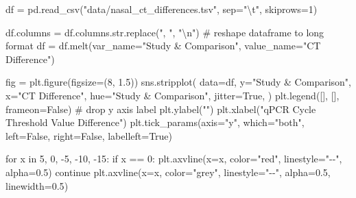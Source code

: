\documentclass[
  letterpaper,
  DIV=11,
  numbers=noendperiod]{scrartcl}
\newenvironment{Shaded}{\begin{snugshade}}{\end{snugshade}}
\newcommand{\BuiltInTok}[1]{\textcolor[rgb]{0.00,0.23,0.31}{#1}}
\newcommand{\CharTok}[1]{\textcolor[rgb]{0.13,0.47,0.30}{#1}}
\newcommand{\CommentTok}[1]{\textcolor[rgb]{0.37,0.37,0.37}{#1}}
\newcommand{\ControlFlowTok}[1]{\textcolor[rgb]{0.00,0.23,0.31}{#1}}
\newcommand{\DecValTok}[1]{\textcolor[rgb]{0.68,0.00,0.00}{#1}}
\newcommand{\FloatTok}[1]{\textcolor[rgb]{0.68,0.00,0.00}{#1}}
\newcommand{\KeywordTok}[1]{\textcolor[rgb]{0.00,0.23,0.31}{#1}}
\newcommand{\NormalTok}[1]{\textcolor[rgb]{0.00,0.23,0.31}{#1}}
\newcommand{\OperatorTok}[1]{\textcolor[rgb]{0.37,0.37,0.37}{#1}}
\newcommand{\StringTok}[1]{\textcolor[rgb]{0.13,0.47,0.30}{#1}}
\newcommand{\VariableTok}[1]{\textcolor[rgb]{0.07,0.07,0.07}{#1}}
\begin{document}
\begin{Shaded}
\begin{Highlighting}[]
\NormalTok{df }\OperatorTok{=}\NormalTok{ pd.read\_csv(}\StringTok{"data/nasal\_ct\_differences.tsv"}\NormalTok{, sep}\OperatorTok{=}\StringTok{"}\CharTok{\textbackslash{}t}\StringTok{"}\NormalTok{, skiprows}\OperatorTok{=}\DecValTok{1}\NormalTok{)}

\NormalTok{df.columns }\OperatorTok{=}\NormalTok{ df.columns.}\BuiltInTok{str}\NormalTok{.replace(}\StringTok{", "}\NormalTok{, }\StringTok{"}\CharTok{\textbackslash{}n}\StringTok{"}\NormalTok{)}
\CommentTok{\# reshape dataframe to long format}
\NormalTok{df }\OperatorTok{=}\NormalTok{ df.melt(var\_name}\OperatorTok{=}\StringTok{"Study \& Comparison"}\NormalTok{, value\_name}\OperatorTok{=}\StringTok{"CT Difference"}\NormalTok{)}


\NormalTok{fig }\OperatorTok{=}\NormalTok{ plt.figure(figsize}\OperatorTok{=}\NormalTok{(}\DecValTok{8}\NormalTok{, }\FloatTok{1.5}\NormalTok{))}
\NormalTok{sns.stripplot(}
\NormalTok{    data}\OperatorTok{=}\NormalTok{df,}
\NormalTok{    y}\OperatorTok{=}\StringTok{"Study \& Comparison"}\NormalTok{,}
\NormalTok{    x}\OperatorTok{=}\StringTok{"CT Difference"}\NormalTok{,}
\NormalTok{    hue}\OperatorTok{=}\StringTok{"Study \& Comparison"}\NormalTok{,}
\NormalTok{    jitter}\OperatorTok{=}\VariableTok{True}\NormalTok{,}
\NormalTok{)}
\NormalTok{plt.legend([], [], frameon}\OperatorTok{=}\VariableTok{False}\NormalTok{)}
\CommentTok{\# drop y axis label}
\NormalTok{plt.ylabel(}\StringTok{""}\NormalTok{)}
\NormalTok{plt.xlabel(}\StringTok{"qPCR Cycle Threshold Value Difference"}\NormalTok{)}
\NormalTok{plt.tick\_params(axis}\OperatorTok{=}\StringTok{"y"}\NormalTok{, which}\OperatorTok{=}\StringTok{"both"}\NormalTok{, left}\OperatorTok{=}\VariableTok{False}\NormalTok{, right}\OperatorTok{=}\VariableTok{False}\NormalTok{, labelleft}\OperatorTok{=}\VariableTok{True}\NormalTok{)}

\ControlFlowTok{for}\NormalTok{ x }\KeywordTok{in} \DecValTok{5}\NormalTok{, }\DecValTok{0}\NormalTok{, }\OperatorTok{{-}}\DecValTok{5}\NormalTok{, }\OperatorTok{{-}}\DecValTok{10}\NormalTok{, }\OperatorTok{{-}}\DecValTok{15}\NormalTok{:}
    \ControlFlowTok{if}\NormalTok{ x }\OperatorTok{==} \DecValTok{0}\NormalTok{:}
\NormalTok{        plt.axvline(x}\OperatorTok{=}\NormalTok{x, color}\OperatorTok{=}\StringTok{"red"}\NormalTok{, linestyle}\OperatorTok{=}\StringTok{"{-}{-}"}\NormalTok{, alpha}\OperatorTok{=}\FloatTok{0.5}\NormalTok{)}
        \ControlFlowTok{continue}
\NormalTok{    plt.axvline(x}\OperatorTok{=}\NormalTok{x, color}\OperatorTok{=}\StringTok{"grey"}\NormalTok{, linestyle}\OperatorTok{=}\StringTok{"{-}{-}"}\NormalTok{, alpha}\OperatorTok{=}\FloatTok{0.5}\NormalTok{, linewidth}\OperatorTok{=}\FloatTok{0.5}\NormalTok{)}


\end{Highlighting}
\end{Shaded}
\end{document}
